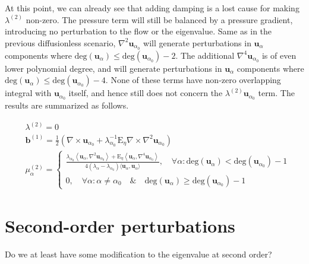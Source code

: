%
At this point, we can already see that adding damping is a lost cause for making $\lambda^{(2)}$ non-zero. The pressure term will still be balanced by a pressure gradient, introducing no perturbation to the flow or the eigenvalue. Same as in the previous diffusionless scenario, $\nabla^2 \mathbf{u}_{\alpha_0}$ will generate perturbations in $\mathbf{u}_\alpha$ components where $\mathrm{deg}(\mathbf{u}_\alpha) \leq \mathrm{deg}(\mathbf{u}_{\alpha_0}) - 2$. The additional $\nabla^4 \mathbf{u}_{\alpha_0}$ is of even lower polynomial degree, and will generate perturbations in $\mathbf{u}_\alpha$ components where $\mathrm{deg}(\mathbf{u}_\alpha) \leq \mathrm{deg}(\mathbf{u}_{\alpha_0}) - 4$. None of these terms have non-zero overlapping integral with $\mathbf{u}_{\alpha_0}$ itself, and hence still does not concern the $\lambda^{(2)} \mathbf{u}_{\alpha_0}$ term. The results are summarized as follows.
%
\begin{mdframed}[style=HighlightBox, frametitle={First-order perturbations under uniform background field, weak magnetic diffusion}]
    \begin{align*}
        &\lambda^{(2)} = 0
        \\
        &\mathbf{b}^{(1)} = \frac{1}{2} \left(\nabla\times \mathbf{u}_{\alpha_0} + \lambda_{\alpha_0}^{-1} \mathrm{E}_\eta \nabla\times \nabla^2 \mathbf{u}_{\alpha_0}\right)
        \\
        &\mu_\alpha^{(2)} = \left\{\begin{aligned}
            \frac{\lambda_{\alpha_0} \left\langle \mathbf{u}_{\alpha}, \nabla^2 \mathbf{u}_{\alpha_0} \right\rangle + \mathrm{E}_\eta \left\langle \mathbf{u}_{\alpha}, \nabla^4 \mathbf{u}_{\alpha_0} \right\rangle}{4(\lambda_\alpha - \lambda_{\alpha_0}) \langle \mathbf{u}_{\alpha}, \mathbf{u}_{\alpha} \rangle},\quad \forall \alpha: \mathrm{deg}(\mathbf{u}_\alpha) < \mathrm{deg}(\mathbf{u}_{\alpha_0}) - 1 \\ 
            0,\quad \forall \alpha: \alpha \neq \alpha_0 \quad \& \quad \mathrm{deg}(\mathbf{u}_\alpha) \geq \mathrm{deg}(\mathbf{u}_{\alpha_0}) - 1
        \end{aligned}\right.
    \end{align*}
\end{mdframed}


\section{Second-order perturbations}

Do we at least have some modification to the eigenvalue at second order?


